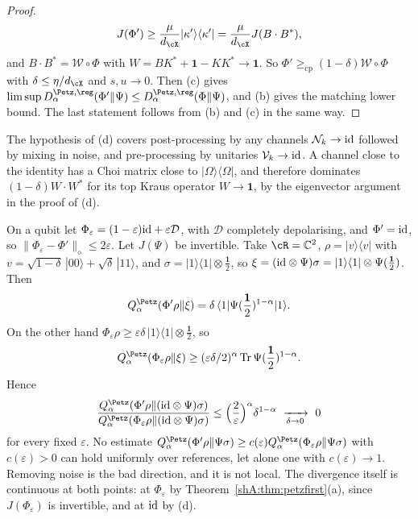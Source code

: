 \begin{proof}
\[
J(\Phi')\ge\frac{\mu}{d_\cX}|\kappa'\rangle\langle\kappa'|=\frac\mu{d_\cX}J(B\cdot B^*),
\]
and $B\cdot B^*=\mathcal W\circ\Phi$ with $W=BK^*+\mathbf 1-KK^*\to\mathbf 1$. So $\Phi'\ge_{\mathrm{cp}}(1-\delta)\mathcal W\circ\Phi$ with $\delta\le\eta/d_\cX$ and $s,u\to0$. Then (c) gives $\limsup D^{\Petz,\reg}_\alpha(\Phi'\|\Psi)\le D^{\Petz,\reg}_\alpha(\Phi\|\Psi)$, and (b) gives the matching lower bound. The last statement follows from (b) and (c) in the same way.
\end{proof}

The hypothesis of (d) covers post-processing by any channels $\mathcal N_k\to\mathrm{id}$ followed by mixing in noise, and pre-processing by unitaries $\mathcal V_k\to\mathrm{id}$. A channel close to the identity has a Choi matrix close to $|\Omega\rangle\langle\Omega|$, and therefore dominates $(1-\delta)W\cdot W^*$ for its top Kraus operator $W\to\mathbf 1$, by the eigenvector argument in the proof of (d).

\begin{example}\label{shA:ex:petzobstruction}
On a qubit let $\Phi_\varepsilon=(1-\varepsilon)\mathrm{id}+\varepsilon\mathcal D$, with $\mathcal D$ completely depolarising, and $\Phi'=\mathrm{id}$, so $\|\Phi_\varepsilon-\Phi'\|_\diamond\le2\varepsilon$. Let $J(\Psi)$ be invertible. Take $\cR=\mathbb C^2$, $\rho=|v\rangle\langle v|$ with $v=\sqrt{1-\delta}\,|00\rangle+\sqrt\delta\,|11\rangle$, and $\sigma=|1\rangle\langle1|\otimes\frac{\mathbf 1}2$, so $\xi=(\mathrm{id}\otimes\Psi)\sigma=|1\rangle\langle1|\otimes\Psi(\frac{\mathbf 1}2)$. Then
\[
Q^\Petz_\alpha(\Phi'\rho\|\xi)=\delta\,\langle1|\Psi(\frac{\mathbf 1}2)^{1-\alpha}|1\rangle.
\]
On the other hand $\Phi_\varepsilon\rho\ge\varepsilon\delta\,|1\rangle\langle1|\otimes\frac{\mathbf 1}2$, so
\[
Q^\Petz_\alpha(\Phi_\varepsilon\rho\|\xi)\ge(\varepsilon\delta/2)^\alpha\Tr\Psi(\frac{\mathbf 1}2)^{1-\alpha}.
\]
Hence
\[
\frac{Q^\Petz_\alpha(\Phi'\rho\|(\id\otimes\Psi)\sigma)}{Q^\Petz_\alpha(\Phi_\varepsilon\rho\|(\id\otimes\Psi)\sigma)}\le\Big(\frac2\varepsilon\Big)^\alpha\delta^{1-\alpha}\ \xrightarrow[\delta\to0]{}\ 0
\]
for every fixed $\varepsilon$. No estimate $Q^\Petz_\alpha(\Phi'\rho\|\Psi\sigma)\ge c(\varepsilon)Q^\Petz_\alpha(\Phi_\varepsilon\rho\|\Psi\sigma)$ with $c(\varepsilon)>0$ can hold uniformly over references, let alone one with $c(\varepsilon)\to1$. Removing noise is the bad direction, and it is not local. The divergence itself is continuous at both points: at $\Phi_\varepsilon$ by Theorem~\ref{shA:thm:petzfirst}(a), since $J(\Phi_\varepsilon)$ is invertible, and at $\mathrm{id}$ by (d).
\end{example}

